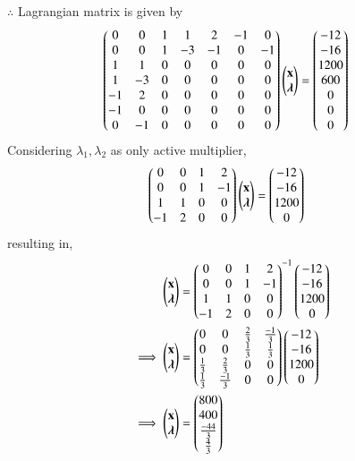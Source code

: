 $\therefore$ Lagrangian matrix is given by
\begin{align}
    \begin{pmatrix}0 & 0 & 1 & 1 & 2 & -1 & 0 \\ 0 & 0 & 1 & -3 & -1 & 0 & -1 \\ 1 & 1 & 0 & 0 & 0 & 0 & 0 \\ 1 & -3 & 0 & 0 & 0 & 0 & 0 \\ -1 & 2 & 0 & 0 & 0 & 0 & 0 \\ -1 & 0 & 0 & 0 & 0 & 0 & 0 \\ 0 & -1 & 0 & 0 & 0 & 0 & 0 \end{pmatrix}\begin{pmatrix}\mathbf{x} \\ \boldsymbol{\lambda} \end{pmatrix} &= \begin{pmatrix}-12 \\ -16 \\ 1200 \\ 600 \\ 0 \\ 0 \\0 \end{pmatrix}
\end{align}
Considering $\lambda_1,\lambda_2$ as only active multiplier,
\begin{align}
    \begin{pmatrix}0 & 0 & 1 & 2 \\ 0 & 0 & 1 & -1 \\ 1 & 1 & 0 & 0 \\ -1 & 2 & 0 & 0\end{pmatrix}\begin{pmatrix}\mathbf{x}\\ \boldsymbol{\lambda}\end{pmatrix} &= \begin{pmatrix}-12 \\ -16 \\ 1200 \\ 0\end{pmatrix}
\end{align}
resulting in,
\begin{align}
    \begin{pmatrix}\mathbf{x} \\ \boldsymbol{\lambda}\end{pmatrix} &= \begin{pmatrix}0 & 0 & 1 & 2 \\ 0 & 0 & 1 & -1 \\ 1 & 1 & 0 & 0 \\ -1 & 2 & 0 & 0\end{pmatrix}^{-1}\begin{pmatrix}-12 \\ -16 \\ 1200 \\ 0\end{pmatrix}
    \\
    \implies   \begin{pmatrix}\mathbf{x} \\ \boldsymbol{\lambda}\end{pmatrix} &= \begin{pmatrix}0 & 0 & \frac{2}{3} & \frac{-1}{3} \\ 0 & 0 & \frac{1}{3} & \frac{1}{3} \\ \frac{1}{3} & \frac{2}{3} & 0 & 0 \\ \frac{1}{3} & \frac{-1}{3} & 0 & 0\end{pmatrix}\begin{pmatrix}-12 \\ -16 \\ 1200 \\ 0\end{pmatrix}
    \\
    \implies \begin{pmatrix}\mathbf{x} \\ \boldsymbol{\lambda}\end{pmatrix} &= \begin{pmatrix}800 \\ 400 \\ \frac{-44}{3} \\ \frac{4}{3} \end{pmatrix}
\end{align}
